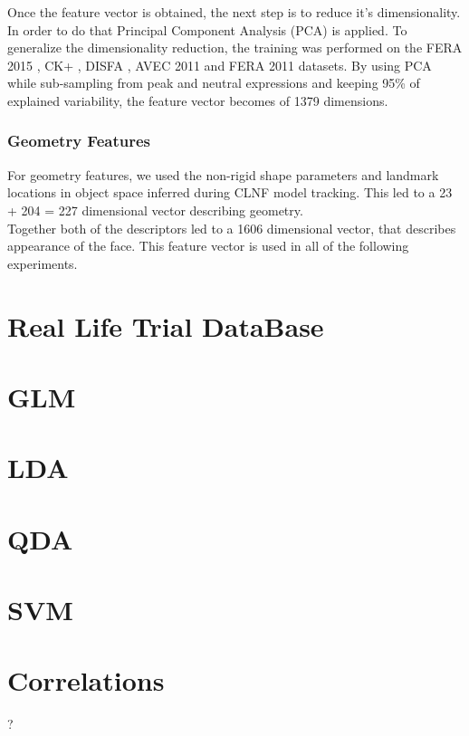 Once the feature vector is obtained, the next step is to reduce it's dimensionality. In order to do that Principal Component Analysis (PCA) is applied. To generalize the dimensionality reduction, the training was performed on the FERA 2015 \cite{FERA15}, CK+ \cite{CK+}, DISFA \cite{DISFA}, AVEC 2011 \cite{AVEC11} and FERA 2011 \cite{FERA11} datasets. By using PCA while sub-sampling from peak and neutral expressions and keeping 95\% of explained variability, the feature vector becomes of 1379 dimensions.

\subsubsection{Geometry Features}
For geometry features, we used the non-rigid shape parameters and landmark locations in object space inferred during CLNF model tracking. This led to a 23 + 204 = 227 dimensional vector describing geometry.\\
Together both of the descriptors led to a 1606 dimensional vector, that describes appearance of the face. This feature vector is used in all of the following experiments.















\section{Real Life Trial DataBase} \label{rldb}

\section{GLM}

\section{LDA}

\section{QDA}

\section{SVM}

\section{Correlations} ?